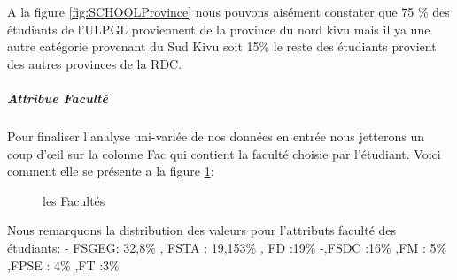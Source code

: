 A la figure \ref{fig:SCHOOLProvince} nous pouvons aisément constater que 75 \% des étudiants
de l'\ac{ULPGL} proviennent de la province du nord kivu mais il ya une autre
catégorie provenant  du Sud Kivu soit 15\% le reste des étudiants  provient des autres provinces de la \ac{RDC}.
\subparagraph{Attribue Faculté}
Pour finaliser l'analyse uni-variée de nos données en entrée nous jetterons un coup d'œil sur la colonne Fac qui contient la faculté choisie par l'étudiant.
Voici comment elle se présente a la figure \ref{fig:FAC}:
\begin{figure}[!htbp]
	\centering
	\caption{les Facultés }
	\label{fig:FAC}
\end{figure}
 Nous remarquons la distribution des valeurs pour
l'attributs faculté des étudiants: - FSGEG: 32,8\% , FSTA : 19,153\% , FD
:19\% -,FSDC :16\% ,FM : 5\% ,FPSE : 4\% ,FT :3\%
